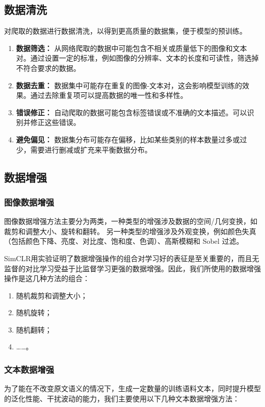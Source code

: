 \documentclass[a4paper]{zreport}
\begin{document}
\subsection{数据清洗}
对爬取的数据进行数据清洗，以得到更高质量的数据集，便于模型的预训练。

\begin{enumerate}
\item \textbf{数据筛选：}
从网络爬取的数据中可能包含不相关或质量低下的图像和文本对。通过设置一定的标准，例如图像的分辨率、文本的长度和可读性，筛选掉不符合要求的数据。
\item \textbf{数据去重： }
数据集中可能存在重复的图像-文本对，这会影响模型训练的效果。通过去除重复项可以提高数据的唯一性和多样性。
\item \textbf{错误修正：}
自动爬取的数据可能包含标签错误或不准确的文本描述。可以识别并修正这些错误。
\item \textbf{避免偏见：}
数据集分布可能存在偏移，比如某些类别的样本数量过多或过少，需要进行删减或扩充来平衡数据分布。
\end{enumerate}


\subsection{数据增强}


\subsubsection{图像数据增强}
图像数据增强方法主要分为两类，一种类型的增强涉及数据的空间/几何变换，如裁剪和调整大小、旋转和翻转。 另一种类型的增强涉及外观变换，例如颜色失真（包括颜色下降、亮度、对比度、饱和度、色调）、高斯模糊和 Sobel 过滤。

SimCLR用实验证明了数据增强操作的组合对学习好的表征是至关重要的，而且无监督的对比学习受益于比监督学习更强的数据增强。因此，我们所使用的数据增强操作是这几种方法的组合：
\begin{enumerate}
\item 随机裁剪和调整大小；
\item 随机旋转；
\item 随机翻转；
\item ……。
\end{enumerate}

\subsubsection{文本数据增强}

为了能在不改变原文语义的情况下，生成一定数量的训练语料文本，同时提升模型的泛化性能、干扰波动的能力，我们主要使用以下几种文本数据增强方法：
\end{document}
